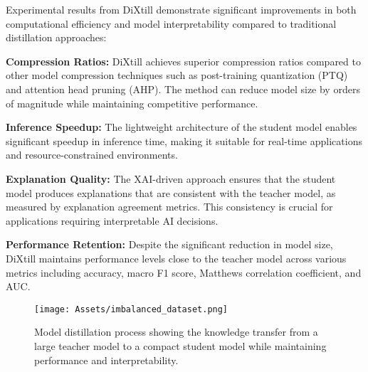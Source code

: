 Experimental results from DiXtill demonstrate significant improvements in both computational efficiency and model interpretability compared to traditional distillation approaches:


\textbf{Compression Ratios:} DiXtill achieves superior compression ratios compared to other model compression techniques such as post-training quantization (PTQ) and attention head pruning (AHP). The method can reduce model size by orders of magnitude while maintaining competitive performance.

\textbf{Inference Speedup:} The lightweight architecture of the student model enables significant speedup in inference time, making it suitable for real-time applications and resource-constrained environments.


\textbf{Explanation Quality:} The XAI-driven approach ensures that the student model produces explanations that are consistent with the teacher model, as measured by explanation agreement metrics. This consistency is crucial for applications requiring interpretable AI decisions.


\textbf{Performance Retention:} Despite the significant reduction in model size, DiXtill maintains performance levels close to the teacher model across various metrics including accuracy, macro F1 score, Matthews correlation coefficient, and AUC.

\begin{figure}[H]
    \centering
    \texttt{[image: Assets/imbalanced\_dataset.png]}
    \caption{Model distillation process showing the knowledge transfer from a large teacher model to a compact student model while maintaining performance and interpretability.}
    \label{fig:model_distillation}
\end{figure}

